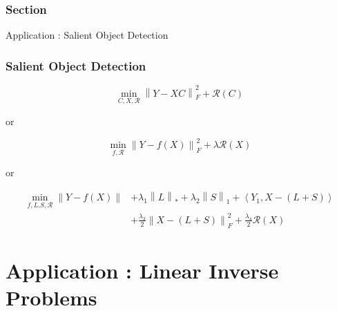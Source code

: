 \documentclass[aspectratio=2516]{beamer}
\begin{document}
\begin{frame}
\frametitle{ Section \uppercase\expandafter{}}


\begin{center}
	\Large Application \uppercase\expandafter{}: Salient Object Detection
\end{center}

\end{frame}


\begin{frame}
\frametitle{Salient Object Detection}

\begin{equation}
\mathop {\min }\limits_{C,X,{\mathcal{R}}} \left\| {Y - XC} \right\|_F^2 + \mathcal{R}\left( C \right)
\end{equation}

or 

\begin{equation}
\mathop {\min }\limits_{f,\mathcal{R}} \left\| {Y - f\left( X \right)} \right\|_{F}^{2} + \lambda \mathcal{R}\left( X \right)
\end{equation}

or 

\begin{equation}
\begin{split}
\mathop {\min }\limits_{f,L.S,\mathcal{R}} \left\| {Y - f\left( X \right)} \right\| & + {\lambda _1}{\left\| L \right\|_*} + {\lambda _2}{\left\| S \right\|_1} + \left\langle {{Y_1},X - \left( {L + S} \right)} \right\rangle  \\
& + \frac{{{\lambda _3}}}{2}\left\| {X - \left( {L + S} \right)} \right\|_F^2 + \frac{{{\lambda _4}}}{2}\mathcal{R}\left( X \right)
\end{split}
\end{equation}



\end{frame}

\section{Application \uppercase\expandafter{}: Linear Inverse Problems}
\end{document}
